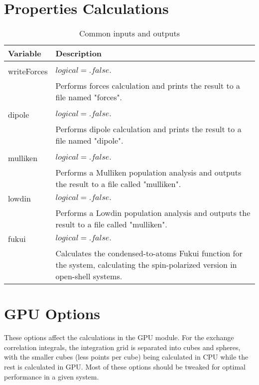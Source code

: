 \section{Properties Calculations}


\begin{Spacing}{1.0}
   \begin{longtable}{ p{} p{} }
   
      \toprule
      \textbf{Variable} & Description \\*
      \midrule \\*
      \endhead
   
      \bottomrule
      \caption{Common inputs and outputs}
      \endfoot

      writeForces  & $ logical = .false. $ \\
      & Performs forces calculation and prints the result to a file named
      "forces". \\
      \\
      dipole & $ logical = .false. $ \\
      & Performs dipole calculation and prints the result to a file named
      "dipole". \\
      \\
      mulliken & $ logical = .false. $ \\
      & Performs a Mulliken population analysis and outputs the result to
      a file called "mulliken".\\
      lowdin & $ logical = .false. $ \\
      & Performs a Lowdin population analysis and outputs the result to
      a file called "mulliken".\\
      fukui & $ logical = .false. $ \\
      & Calculates the condensed-to-atoms Fukui function for the system, 
      calculating the spin-polarized version in open-shell systems.\\
   \end{longtable}
\end{Spacing}

\section{GPU Options}

These options affect the calculations in the GPU module. For the exchange
correlation integrals, the integration grid is separated into cubes and spheres,
with the smaller cubes (less points per cube) being calculated in CPU while the
rest is calculated in GPU. Most of these options should be tweaked for optimal
performance in a given system.

